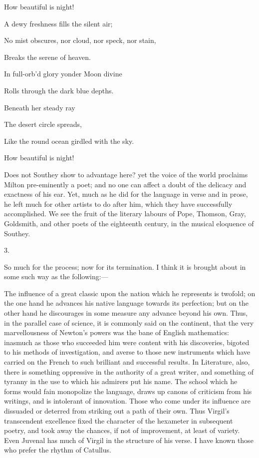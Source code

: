 How beautiful is night!

A dewy freshness fills the silent air;

No mist obscures, nor cloud, nor speck, nor stain,

Breaks the serene of heaven.

In full-orb'd glory yonder Moon divine

Rolls through the dark blue depths.

Beneath her steady ray

The desert circle spreads,

Like the round ocean girdled with the sky.

How beautiful is night!

Does not Southey show to advantage here? yet the voice of the world
proclaims Milton pre-eminently a poet; and no one can affect a doubt
of the delicacy and exactness of his ear. Yet, much as he did for the
language in verse and in prose, he left much for other artists to do
after him, which they have successfully accomplished. We see the fruit
of the literary labours of Pope, Thomson, Gray, Goldsmith, and other
poets of the eighteenth century, in the musical eloquence of Southey.

3.

So much for the process; now for its termination. I think it is
brought about in some such way as the following:—

The influence of a great classic upon the nation which he
represents is twofold; on the one hand he advances his native language
towards its perfection; but on the other hand he discourages in some
measure any advance beyond his own. Thus, in the parallel case of
science, it is commonly said on the continent, that the very
marvellousness of Newton's powers was the bane of English mathematics:
inasmuch as those who succeeded him were content with his
discoveries, bigoted to his methods of investigation, and averse to
those new instruments which have carried on the French to such
brilliant and successful results. In Literature, also, there is
something oppressive in the authority of a great writer, and something
of tyranny in the use to which his admirers put his name. The school
which he forms would fain monopolize the language, draws up canons of
criticism from his writings, and is intolerant of innovation. Those
who come under its influence are dissuaded or deterred from striking
out a path of their own. Thus Virgil's transcendent excellence fixed
the character of the hexameter in subsequent poetry, and took away the
chances, if not of improvement, at least of variety. Even Juvenal has
much of Virgil in the structure of his verse. I have known those who
prefer the rhythm of Catullus.


